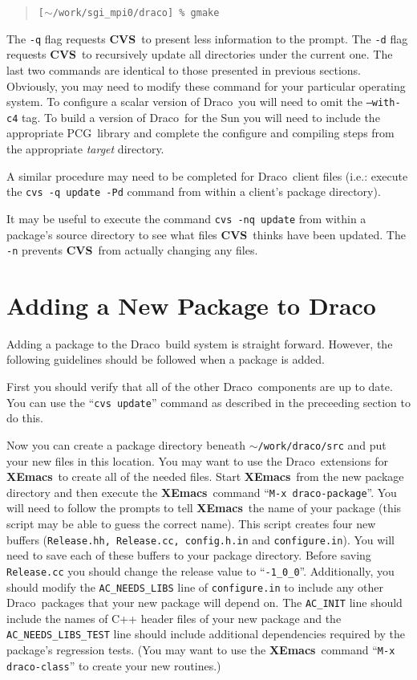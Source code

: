 \documentclass[10pt]{nmemo}
\newcommand{\comp}[1]{\normalfont\normalsize\texttt{#1}}
\newcommand{\draco}{{\normalfont\sffamily Draco}}
\newcommand{\pcg}{{\normalfont\sffamily PCG}}
\newcommand{\cvs}{{\normalfont\bfseries CVS}}
\newcommand{\xemacs}{{\normalfont\bfseries XEmacs}}
\begin{document}
\begin{verse}
\texttt{[$\sim$/work/sgi\_mpi0/draco] \% gmake}
\end{verse}
\normalsize

The \comp{-q} flag requests \cvs\ to present less information to the
prompt.  The \comp{-d} flag requests \cvs\ to recursively update all
directories under the current one.  The last two commands are
identical to those presented in previous sections.  Obviously, you may
need to modify these command for your particular operating system.  To
configure a scalar version of \draco\ you will need to omit the
\comp{--with-c4} tag.  To build a version of \draco\ for the Sun you
will need to include the appropriate \pcg\ library and complete the
configure and compiling steps from the appropriate \emph{target}
directory.

A similar procedure may need to be completed for \draco\ client files
(i.e.: execute the \comp{cvs -q update -Pd} command from within a
client's package directory).

It may be useful to execute the command \comp{cvs -nq update} from
within a package's source directory to see what files \cvs\ thinks
have been updated.  The \comp{-n} prevents \cvs\ from actually
changing any files.


\section{Adding a New Package to Draco}

Adding a package to the \draco\ build system is straight forward.
However, the following guidelines should be followed when a package is
added.

First you should verify that all of the other \draco\ components are
up to date.  You can use the ``\comp{cvs update}'' command as described in
the preceeding section to do this.  

Now you can create a package directory beneath
\comp{$\sim$/work/draco/src} and put your new files in this location.
You may want to use the \draco\ extensions for \xemacs\ to create all
of the needed files.  Start \xemacs\ from the new package directory
and then execute the \xemacs\ command ``\comp{M-x draco-package}''.
You will need to follow the prompts to tell \xemacs\ the name of your
package (this script may be able to guess the correct name).  This
script creates four new buffers (\comp{Release.hh, Release.cc,
  config.h.in} and \comp{configure.in}).  You will need to save each
of these buffers to your package directory.  Before saving
\comp{Release.cc} you should change the release value to
``\comp{-1\_0\_0}''.  Additionally, you should modify the
\comp{AC\_NEEDS\_LIBS} line of \comp{configure.in} to include any
other \draco\ packages that your new package will depend on.  The
\comp{AC\_INIT} line should include the names of C++ header files of
your new package and the \comp{AC\_NEEDS\_LIBS\_TEST} line should
include additional dependencies required by the package's regression
tests.  (You may want to use the \xemacs\ command ``\comp{M-x
  draco-class}'' to create your new routines.)
\end{document}
